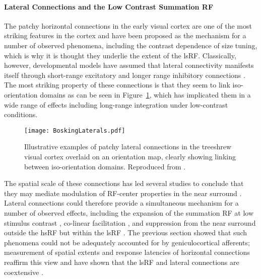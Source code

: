 \paragraph{Lateral Connections and the Low Contrast Summation RF}

The patchy horizontal connections in the early visual cortex are one
of the most striking features in the cortex and have been proposed as
the mechanism for a number of observed phenomena, including the
contrast dependence of size tuning, which is why it is thought they
underlie the extent of the lsRF. Classically, however, developmental
models have assumed that lateral connectivity manifests itself through
short-range excitatory and longer range inhibitory connections
\citep{VonderMalsburg1973,Obermayer1990b}. The most striking property
of these connections is that they seem to link iso-orientation domains
as can be seen in Figure~\ref{BoskingLatExc}, which has implicated
them in a wide range of effects including long-range integration under
low-contrast conditions.

\begin{figure}
	\centering
        \texttt{[image: BoskingLaterals.pdf]}
	\caption[Patchy lateral connections overlaid on an orientation
      map. Reproduced from \cite{Bosking1997}.]{Illustrative
      examples of patchy lateral connections in the treeshrew visual
      cortex overlaid on an orientation map, clearly showing linking
      between iso-orientation domains. Reproduced from
      \cite{Bosking1997}.}
	\label{BoskingLatExc}
\end{figure}

The spatial scale of these connections has led several studies to
conclude that they may mediate modulation of RF-center properties in
the near surround \citep{Angelucci2002}. Lateral connections could
therefore provide a simultaneous mechanism for a number of observed
effects, including the expansion of the summation RF at low stimulus
contrast \citep{Sceniak1999}, co-linear facilitation
\citep{Mizobe2001}, and suppression from the near surround
outside the hsRF but within the lsRF
\citep{Sceniak2001,Levitt2002}. The previous section showed that such
phenomena could not be adequately accounted for by geniculocortical
afferents; measurement of spatial extents and response latencies of
horizontal connections reaffirm this view and have shown that the lsRF
and lateral connections are coextensive \citep{Angelucci2002}.

